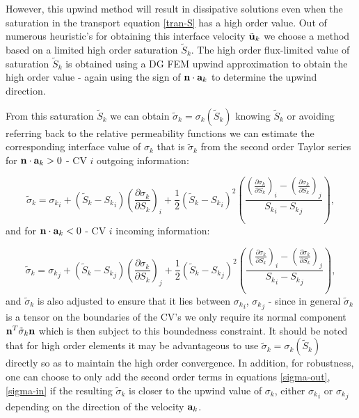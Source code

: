 However, this upwind method will result in dissipative solutions even when the saturation in the transport equation \ref{tran-S}
has a high order value. 
Out of numerous heuristic's for obtaining this interface velocity ${\tilde{\bf u}}_k$ we choose 
a method based on a limited high order saturation $\tilde S_k$.  
The high order flux-limited value of saturation $\tilde S_k$ is obtained using a DG FEM upwind approximation to 
obtain the high order value - again using the 
sign of ${\bf n}\cdot {\bf a}_k$ to determine the upwind direction. 

From this saturation $\tilde S_k$ we can obtain 
$\tilde\sigma_k = \sigma_k (\tilde S_k)$ knowing $\tilde S_k$ or avoiding referring back to the relative 
permeability functions 
we can estimate the corresponding interface value of $\sigma_k$ that is 
$\tilde\sigma_k$ from the second order Taylor series for ${\bf n}\cdot {\bf a}_k>0$ - CV $i$ outgoing information: 

\begin{equation}
\tilde\sigma_k =   {\sigma_k}_i + (\tilde S_k - {S_k}_i) \left(\frac{\partial\sigma_k}{\partial S_k}\right)_i 
+\frac{1}{2} (\tilde S_k - {S_k}_i)^2   
\left(  \frac{  \left(\frac{\partial\sigma_k}{\partial S_k}\right)_i - \left(\frac{\partial\sigma_k}{\partial S_k}\right)_j  }  
{{S_k}_i - {S_k}_j}  \right) , 
\label{sigma-out}
\end{equation} 
and for ${\bf n}\cdot {\bf a}_k<0$ - CV $i$ incoming information:

\begin{equation}
\tilde\sigma_k =  {\sigma_k}_j + (\tilde S_k - {S_k}_j) \left(\frac{\partial\sigma_k}{\partial S_k}\right)_j 
+\frac{1}{2} (\tilde S_k - {S_k}_j)^2   
\left(  \frac{  \left(\frac{\partial\sigma_k}{\partial S_k}\right)_i - \left(\frac{\partial\sigma_k}{\partial S_k}\right)_j  }  
{{S_k}_i - {S_k}_j} \right), 
\label{sigma-in}
\end{equation} 
and $\tilde\sigma_k$ is also adjusted to ensure that it lies between ${\sigma_k}_i$, ${\sigma_k}_j$ - since 
in general $\tilde\sigma_k$ is a tensor on the boundaries of the CV's we only require its 
normal component ${\bf n}^T\tilde\sigma_k {\bf n}$ which is then subject to this boundedness constraint. 
It should be noted that for high order elements it may be advantageous to use $\tilde\sigma_k = \sigma_k (\tilde S_k)$ 
directly so as to maintain the high order convergence. In addition, for robustness, one can 
choose to only add the second order terms in equations  \ref{sigma-out}, \ref{sigma-in} if the resulting 
$\tilde\sigma_k $ is closer to the upwind value of $\sigma_k$, either ${\sigma_k}_i$ or ${\sigma_k}_j$ 
depending on the direction of the velocity ${\bf a}_k$. 

